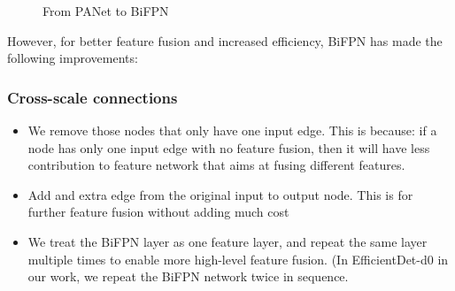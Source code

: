 \documentclass[journal,conference]{IEEEtran}
\begin{document}
\begin{figure}[htbp]
  \centering
  \caption{From PANet to BiFPN}\label{fig:bifpn}
\end{figure}

However, for better feature fusion and increased efficiency, BiFPN has made the following improvements:

\subsubsection{Cross-scale connections}
\begin{itemize}
  \item We remove those nodes that only have one input edge.
        This is because: if a node has only one input edge with no feature fusion, then it will have less contribution to feature network that aims at fusing different features.
  \item Add and extra edge from the original input to output node. This is for further feature fusion without adding much cost
  \item We treat the BiFPN layer as one feature layer, and repeat the same layer multiple times to enable more high-level feature fusion. (In EfficientDet-d0 in our work, we repeat the BiFPN network twice in sequence.
\end{itemize}
\end{document}
